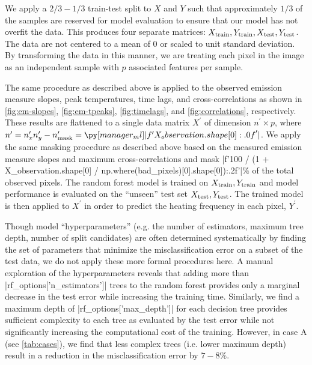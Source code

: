 We apply a $2/3-1/3$ train-test split to $X$ and $Y$ such that approximately $1/3$ of the samples are reserved for model evaluation to ensure that our model has not overfit the data.
This produces four separate matrices: $X_\textup{train},Y_\textup{train},X_\textup{test},Y_\textup{test}$.
The data are not centered to a mean of 0 or scaled to unit standard deviation.
By transforming the data in this manner, we are treating each pixel in the image as an independent sample with $p$ associated features per sample.

The same procedure as described above is applied to the observed emission measure slopes, peak temperatures, time lags, and cross-correlations as shown in \autoref{fig:em-slopes}, \autoref{fig:em-tpeaks}, \autoref{fig:timelags}, and \autoref{fig:correlations}, respectively.
These results are flattened to a single data matrix $X^\prime$ of dimension $n^\prime\times p$, where $n^\prime=n_x^\prime n_y^\prime - n^\prime_\textup{mask}=\py[manager_ml]|f'{X_observation.shape[0]:.0f}'|$.
We apply the same masking procedure as described above based on the measured emission measure slopes and maximum cross-correlations and mask \py[manager_ml]|f'{100 / (1 + X_observation.shape[0] / np.where(bad_pixels)[0].shape[0]):.2f}'|$\%$ of the total observed pixels.
The random forest model is trained on $X_\textup{train},Y_\textup{train}$ and model performance is evaluated on the ``unseen'' test set $X_\textup{test},Y_\textup{test}$.
The trained model is then applied to $X^\prime$ in order to predict the heating frequency in each pixel, $Y^\prime$.

Though model ``hyperparameters'' (e.g. the number of estimators, maximum tree depth, number of split candidates) are often determined systematically by finding the set of parameters that minimize the misclassification error on a subset of the test data, we do not apply these more formal procedures here.
A manual exploration of the hyperparameters reveals that adding more than \py[manager_ml]|rf_options['n_estimators']| trees to the random forest provides only a marginal decrease in the test error while increasing the training time.
Similarly, we find a maximum depth of \py[manager_ml]|rf_options['max_depth']| for each decision tree provides sufficient complexity to each tree as evaluated by the test error while not significantly increasing the computational cost of the training.
However, in case A (see \autoref{tab:cases}), we find that less complex trees (i.e. lower maximum depth) result in a reduction in the misclassification error by $7-8\%$.

